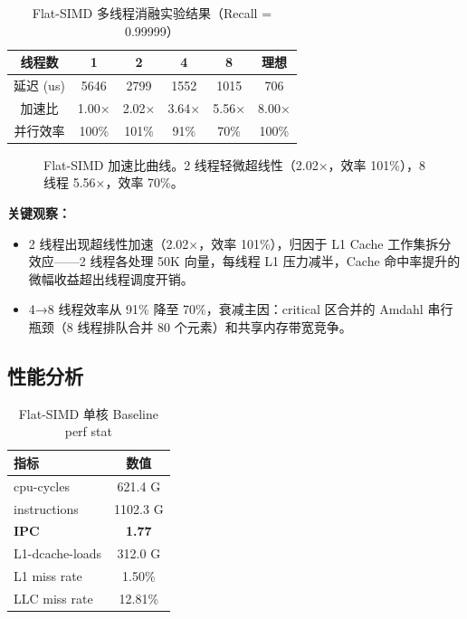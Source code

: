 \documentclass[UTF8,a4paper,10pt]{ctexart}
\begin{document}
\begin{table}[H]
\centering
\caption{Flat-SIMD 多线程消融实验结果（Recall = 0.99999）}
\begin{tabular}{cccccc}
\hline
线程数 & 1 & 2 & 4 & 8 & 理想 \\
\hline
延迟 (us) & 5646 & 2799 & 1552 & 1015 & 706 \\
加速比 & 1.00× & 2.02× & 3.64× & 5.56× & 8.00× \\
并行效率 & 100\% & 101\% & 91\% & 70\% & 100\% \\
\hline
\end{tabular}
\end{table}

\begin{figure}[H]
\centering
{}
\caption{Flat-SIMD 加速比曲线。2 线程轻微超线性（2.02×，效率 101\%），8 线程 5.56×，效率 70\%。}
\end{figure}

\textbf{关键观察：}
\begin{itemize}
\item 2 线程出现超线性加速（2.02×，效率 101\%），归因于 L1 Cache 工作集拆分效应——2 线程各处理 50K 向量，每线程 L1 压力减半，Cache 命中率提升的微幅收益超出线程调度开销。
\item 4→8 线程效率从 91\% 降至 70\%，衰减主因：critical 区合并的 Amdahl 串行瓶颈（8 线程排队合并 80 个元素）和共享内存带宽竞争。
\end{itemize}

\subsection{性能分析}

\begin{table}[H]
\centering
\caption{Flat-SIMD 单核 Baseline perf stat}
\begin{tabular}{lc}
\hline
指标 & 数值 \\
\hline
cpu-cycles & 621.4 G \\
instructions & 1102.3 G \\
\textbf{IPC} & \textbf{1.77} \\
L1-dcache-loads & 312.0 G \\
L1 miss rate & 1.50\% \\
LLC miss rate & 12.81\% \\
\hline
\end{tabular}
\end{table}
\end{document}
